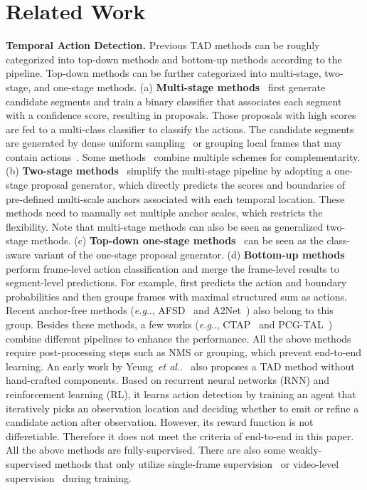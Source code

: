 \documentclass[lettersize,journal]{IEEEtran}
\makeatletter
\DeclareRobustCommand\onedot{\futurelet\@let@token\@onedot}
\def\@onedot{\ifx\@let@token.\else.\null\fi\xspace}
\def\eg{\emph{e.g}\onedot} \def\Eg{\emph{E.g}\onedot}
\def\etal{\emph{et al}\onedot}
\makeatother
\begin{document}
\section{Related Work}
\noindent\textbf{Temporal Action Detection.} Previous TAD methods can be roughly categorized into top-down methods and bottom-up methods according to the pipeline. Top-down methods can be further categorized into multi-stage, two-stage, and one-stage methods.
(a) \textbf{Multi-stage methods}~\cite{xu2020g,lin2019bmn,yuan2016temporal,heilbron2017scc,liu2020self,Liu_2021_CVPR} first generate candidate segments and train a binary classifier that associates each segment with a confidence score, resulting in proposals. Those proposals with high scores are fed to a multi-class classifier to classify the actions. 
The candidate segments are generated by dense uniform sampling~\cite{shou2016temporal,gao2017turn} or grouping local frames that may contain actions~\cite{lin2018bsn}.
Some methods~\cite{gao2018ctap,liu2019multi} combine multiple schemes for complementarity.
(b) \textbf{Two-stage methods}~\cite{xu2017r,chao2018rethinking,escorcia2016daps,buch2017sst} simplify the multi-stage pipeline by adopting a one-stage proposal generator, which directly predicts the scores and boundaries of pre-defined multi-scale anchors associated with each temporal location. 
These methods need to manually set multiple anchor scales, which restricts the flexibility. Note that multi-stage methods can also be seen as generalized two-stage methods. 
(c) \textbf{Top-down one-stage methods}~\cite{lin2017single,long2019gaussian} can be seen as the class-aware variant of the one-stage proposal generator. 
(d) \textbf{Bottom-up methods} perform frame-level action classification and merge the frame-level results to segment-level predictions. For example, \cite{yuan2017temporal} first predicts the action and boundary probabilities and then groups frames with maximal structured sum as actions. 
Recent anchor-free methods (\eg, AFSD~\cite{lin2021learning} and A2Net~\cite{yang2020revisiting}) also belong to this group. 
Besides these methods, a few works (\eg, CTAP~\cite{gao2018ctap} and PCG-TAL~\cite{su2021pcg}) combine different pipelines to enhance the performance. 
All the above methods require post-processing steps such as NMS or grouping, which prevent end-to-end learning.
An early work by Yeung~\etal~\cite{yeung2016end} also proposes a TAD method without hand-crafted components. Based on recurrent neural networks (RNN) and reinforcement learning (RL), it learns action detection by training an agent that iteratively picks an observation location and deciding whether to emit or refine a candidate action after observation. However, its reward function is not differetiable. Therefore it does not meet the criteria of end-to-end in this paper. 
All the above methods are fully-supervised. There are also some weakly-supervised methods that only utilize single-frame supervision~\cite{ma2020sf} or video-level supervision~\cite{nguyen2018weakly,paul2018w,liu2019completeness,shou2018autoloc,yu2019temporal,huang2021modeling,yang2021multi,zeng2019breaking,huang2020relational,islam2021hybrid,zhai2020two,huang2021foreground} during training. 
\end{document}
